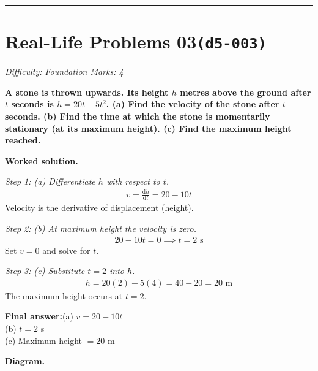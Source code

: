 \documentclass[11pt]{article}
\newcommand{\question}[1]{\par\medskip\noindent\textbf{#1}\par}
\begin{document}
\medskip\hrule

\section*{Real-Life Problems 03\quad\small\texttt{(d5-003)}}
\textit{Difficulty: Foundation \quad\textbar\quad Marks: 4}

\question{A stone is thrown upwards. Its height \( h \) metres above the ground after \( t \) seconds is \( h = 20t - 5t^2 \). (a) Find the velocity of the stone after \( t \) seconds. (b) Find the time at which the stone is momentarily stationary (at its maximum height). (c) Find the maximum height reached.}

\textbf{Worked solution.}

\textit{Step 1: (a) Differentiate \( h \) with respect to \( t \).}
\[\begin{gathered}
v = \frac{\mathrm{d}h}{\mathrm{d}t} = 20 - 10t
\end{gathered}\]
Velocity is the derivative of displacement (height).

\textit{Step 2: (b) At maximum height the velocity is zero.}
\[\begin{gathered}
20 - 10t = 0 \implies t = 2 \text{ s}
\end{gathered}\]
Set \( v = 0 \) and solve for \( t \).

\textit{Step 3: (c) Substitute \( t = 2 \) into \( h \).}
\[\begin{gathered}
h = 20(2) - 5(4) = 40 - 20 = 20 \text{ m}
\end{gathered}\]
The maximum height occurs at \( t = 2 \).

\begin{answerbox}
\textbf{Final answer:}\quad (a) \(\displaystyle  v = 20 - 10t \) \\[3pt]  (b) \(\displaystyle  t = 2 \) s \\[3pt]  (c) Maximum height \(\displaystyle  = 20 \) m
\end{answerbox}
\textbf{Diagram.}
\end{document}
